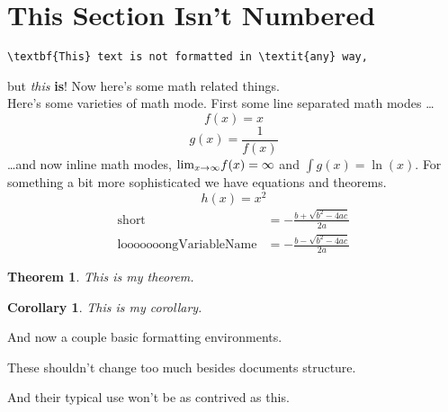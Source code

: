 \documentclass{article}
\newtheorem{thm}{Theorem}
\newtheorem{corr}{Corollary}
\begin{document}
\section*{This Section Isn't Numbered}
\begin{verbatim}
\textbf{This} text is not formatted in \textit{any} way,
\end{verbatim}
but \textit{this} \textbf{is}! Now here's some math related things.\\
Here's some varieties of math mode. First some line separated math modes \dots
\[f(x)=x\]
$$g(x)=\frac{1}{f(x)}$$
\dots and now inline math modes, \($lim$_{x\rightarrow\infty}f(x)=\infty\) and $\int g(x)=\ln(x)$. For something a bit more sophisticated we have equations and theorems.
\begin{equation}
h(x)=x^2
\end{equation}
\begin{eqnarray}
\text{short} &= -\frac{b+\sqrt{b^2-4ac}}{2a}\\
\text{looooooongVariableName} &= -\frac{b-\sqrt{b^2-4ac}}{2a}
\end{eqnarray}
\begin{thm}
This is my theorem.
\end{thm}
\begin{corr}
This is my corollary.
\end{corr}
\begin{center}
And now a couple basic formatting environments.
\end{center}
\begin{flushright}
These shouldn't change too much besides documents structure.
\end{flushright}
\begin{flushleft}
And their typical use won't be as contrived as this.
\end{flushleft}
\end{document}
